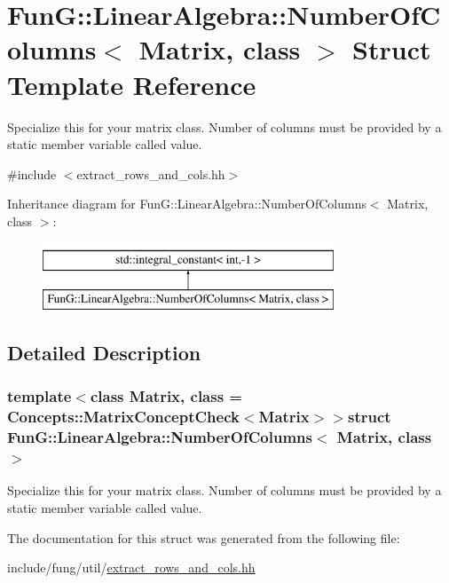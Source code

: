 \hypertarget{structFunG_1_1LinearAlgebra_1_1NumberOfColumns}{\section{Fun\-G\-:\-:Linear\-Algebra\-:\-:Number\-Of\-Columns$<$ Matrix, class $>$ Struct Template Reference}
\label{structFunG_1_1LinearAlgebra_1_1NumberOfColumns}
}


Specialize this for your matrix class. Number of columns must be provided by a static member variable called value.  




{\ttfamily \#include $<$extract\-\_\-rows\-\_\-and\-\_\-cols.\-hh$>$}

Inheritance diagram for Fun\-G\-:\-:Linear\-Algebra\-:\-:Number\-Of\-Columns$<$ Matrix, class $>$\-:\begin{figure}[H]
\begin{center}
\leavevmode
\includegraphics[height=2.000000cm]{structFunG_1_1LinearAlgebra_1_1NumberOfColumns}
\end{center}
\end{figure}


\subsection{Detailed Description}
\subsubsection*{template$<$class Matrix, class = Concepts\-::\-Matrix\-Concept\-Check$<$\-Matrix$>$$>$struct Fun\-G\-::\-Linear\-Algebra\-::\-Number\-Of\-Columns$<$ Matrix, class $>$}

Specialize this for your matrix class. Number of columns must be provided by a static member variable called value. 

The documentation for this struct was generated from the following file\-:\begin{DoxyCompactItemize}
\item 
include/fung/util/\hyperlink{extract__rows__and__cols_8hh}{extract\-\_\-rows\-\_\-and\-\_\-cols.\-hh}\end{DoxyCompactItemize}
